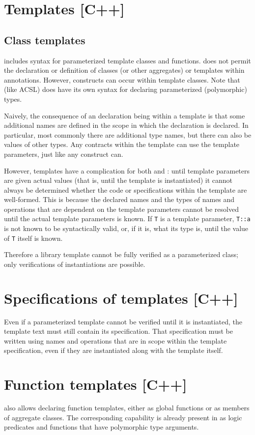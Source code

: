 \section{Templates [C++]}
\label{sec:tempaltes}
\subsection{Class templates}

\lang{} includes syntax for parameterized template classes and functions. \NAME{} does not permit the declaration or definition of classes (or other aggregates) or templates  within \NAME{} annotations. However, \NAME{} constructs can occur within template classes. Note that \NAME{} (like ACSL) does have its own syntax for declaring parameterized (polymorphic) types.

Naively, the consequence of an \NAME{} declaration being within a template is that some additional names are defined in the scope in which the \NAME{} declaration is declared. In particular, most commonly there are additional type names, but there can also be values of other types. Any \NAME{} contracts within the template can use the template parameters, just like any \lang{} construct can. 

However, templates have a complication for both \lang{} and \NAME{}: until template parameters are given actual values (that is, until the template is instantiated) it cannot always be determined whether the code or specifications within the template are well-formed. This is because the declared names and the types of names and operations that are dependent on the template parameters cannot be resolved until the actual template parameters is known.  If \lstinline|T| is a template parameter, \lstinline|T::a| is not known to be syntactically valid, or, if it is, what its type is, until the value of \lstinline|T| itself is known.

Therefore a library template cannot be fully verified as a parameterized class; only verifications of instantiations are possible.

\section{Specifications of templates [C++]}

Even if a parameterized template cannot be verified until it is instantiated, the template text must still contain its specification. That specification must be written using names and operations that are in scope within the template specification, even if they are instantiated along with the template itself.

\section{Function templates [C++]}

\lang{} also allows declaring function templates, either as global functions or as members of aggregate classes. The corresponding capability is already present in \NAME{} as logic predicates and functions that have polymorphic type arguments.